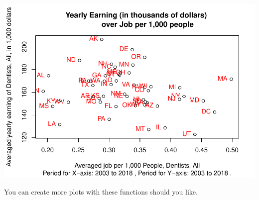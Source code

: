 \documentclass[
]{article}
\begin{document}
\includegraphics{BLS_Graphic_Reproduction_files/figure-latex/unnamed-chunk-11-1.pdf}

You can create more plots with these functions should you like.
\end{document}
